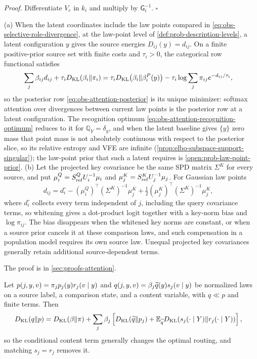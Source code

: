 \noindent\emph{Proof.}
Differentiate \(V_e\) in \(k_i\) and multiply by \(\mathsf G_i^{-1}\).
\(\square\)

(a) When the latent coordinates include the law points compared in
\eqref{eq:obs-selective-role-divergence}, at the law-point level of
\cref{def:prob-description-levels}, a latent configuration \(y\) gives the
source energies \(D_{ij}(y)=d_{ij}\). On a finite positive-prior source set
with finite costs and \(\tau_i>0\), the categorical row functional satisfies
\begin{equation}
\sum_j\beta_{ij}d_{ij}+\tau_iD_{\mathrm{KL}}(\beta_i\Vert\pi_i)
=\tau_iD_{\mathrm{KL}}\bigl(\beta_i\Vert\beta_i^P(y)\bigr)
-\tau_i\log\sum_j\pi_{ij}e^{-d_{ij}/\tau_i},
\label{eq:obs-selective-row-functional}
\end{equation}
so the posterior row \eqref{eq:obs-attention-posterior} is its unique
minimizer: softmax attention over divergences between current law points is
the posterior row at a latent configuration. The recognition optimum
\eqref{eq:obs-attention-recognition-optimum} reduces to it for
\(\mathbb Q_Y=\delta_y\), and when the latent baseline gives \(\{y\}\) zero mass
that point mass is not absolutely continuous with respect to the posterior
slice, so its relative entropy and VFE are infinite
(\cref{prop:elbo-subspace-support-singular}); the law-point prior that such a
latent requires is \cref{open:prob-law-point-prior}. (b) Let the projected key
covariance be the same SPD matrix \(\Sigma^K\) for every source, and put
\(\mu_i^Q=S^Q_{\rm ref}U_i^{-1}\mu_i\) and \(\mu_j^K=S^K_{\rm ref}U_j^{-1}\mu_j\).
For Gaussian law points
\begin{equation}
d_{ij}=d_i^\circ-(\mu_i^Q)^\top(\Sigma^K)^{-1}\mu_j^K
+\tfrac12(\mu_j^K)^\top(\Sigma^K)^{-1}\mu_j^K,
\label{eq:obs-selective-dot-product}
\end{equation}
where \(d_i^\circ\) collects every term independent of \(j\), including the
query covariance terms, so whitening gives a dot-product logit together with a
key-norm bias and \(\log\pi_{ij}\). The bias disappears when the whitened key
norms are constant, or when a source prior cancels it at these comparison
laws, and such compensation in a population model requires its own source
law. Unequal projected key covariances generally retain additional
source-dependent terms.

The proof is in \cref{sec:proofs-attention}.

Let \(p(j,y,v)=\pi_jp_j(y)r_j(v\mid y)\) and
\(q(j,y,v)=\beta_j\widetilde q(y)s_j(v\mid y)\) be normalized laws on a
source label, a comparison state, and a content variable, with \(q\ll p\) and
finite terms. Then
\begin{equation}
D_{\mathrm{KL}}(q\Vert p)=D_{\mathrm{KL}}(\beta\Vert\pi)+
\sum_j\beta_j\left[
D_{\mathrm{KL}}(\widetilde q\Vert p_j)+
\mathbb E_{\widetilde q}D_{\mathrm{KL}}(s_j(\cdot\mid Y)\Vert r_j(\cdot\mid Y))\right],
\label{eq:obs-selective-content-kl}
\end{equation}
so the conditional content term generally changes the optimal routing, and
matching \(s_j=r_j\) removes it.

